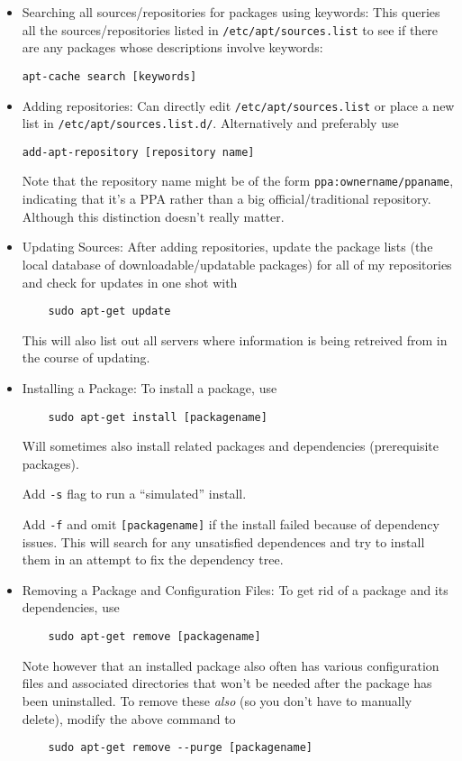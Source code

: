 \documentclass[12pt]{article}
\theoremstyle{plain}
\theoremstyle{definition}
\theoremstyle{remark}
\begin{document}
\begin{itemize}
  \item Searching all sources/repositories for packages using keywords:
    This queries all the sources/repositories listed in
    \texttt{/etc/apt/sources.list} to see if there are any packages
    whose descriptions involve keywords:
    \lstset{style=log}
    \begin{lstlisting}
apt-cache search [keywords]
    \end{lstlisting}

  \item Adding repositories:
    Can directly edit \texttt{/etc/apt/sources.list} or place a new
    list in \texttt{/etc/apt/sources.list.d/}.
    Alternatively and preferably use
    \begin{lstlisting}
add-apt-repository [repository name]
    \end{lstlisting}
    Note that the repository name might be of the form
    \texttt{ppa:ownername/ppaname}, indicating that it's a PPA rather
    than a big official/traditional repository. Although this
    distinction doesn't really matter.

  \item Updating Sources:
    After adding repositories, update the package lists (the local
    database of downloadable/updatable packages) for all of my
    repositories and check for updates in one shot with
    \begin{lstlisting}
    sudo apt-get update
    \end{lstlisting}
    This will also list out all servers where information is being
    retreived from in the course of updating.

  \item Installing a Package:
    To install a package, use
    \begin{lstlisting}
    sudo apt-get install [packagename]
    \end{lstlisting}
    Will sometimes also install related packages and dependencies
    (prerequisite packages).

    Add \texttt{-s} flag to run a ``simulated'' install.

    Add \texttt{-f} and omit \texttt{[packagename]} if the install
    failed because of dependency issues.
    This will search for any unsatisfied dependences and try to install
    them in an attempt to fix the dependency tree.

  \item Removing a Package and Configuration Files:
    To get rid of a package and its dependencies, use
    \begin{lstlisting}
    sudo apt-get remove [packagename]
    \end{lstlisting}
    Note however that an installed package also often has various
    configuration files and associated directories that won't be needed
    after the package has been uninstalled.
    To remove these \emph{also} (so you don't have to manually delete),
    modify the above command to
    \begin{lstlisting}
    sudo apt-get remove --purge [packagename]
    \end{lstlisting}


\end{itemize}
\end{document}
